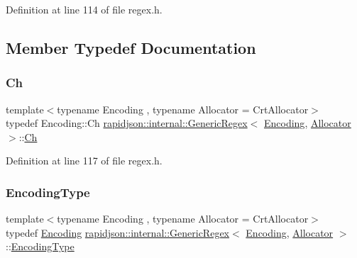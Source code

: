 Definition at line 114 of file regex.\+h.



\subsection{Member Typedef Documentation}
\mbox{\label{classrapidjson_1_1internal_1_1_generic_regex_a14c4770316f826aa03ee393ec218fe3d}} 
\subsubsection{\texorpdfstring{Ch}{Ch}}
{\footnotesize\ttfamily template$<$typename Encoding , typename Allocator  = Crt\+Allocator$>$ \\
typedef Encoding\+::\+Ch \mbox{\hyperlink{classrapidjson_1_1internal_1_1_generic_regex}{rapidjson\+::internal\+::\+Generic\+Regex}}$<$ \mbox{\hyperlink{classrapidjson_1_1_encoding}{Encoding}}, \mbox{\hyperlink{classrapidjson_1_1_allocator}{Allocator}} $>$\+::\mbox{\hyperlink{classrapidjson_1_1internal_1_1_generic_regex_a14c4770316f826aa03ee393ec218fe3d}{Ch}}}



Definition at line 117 of file regex.\+h.

\mbox{\label{classrapidjson_1_1internal_1_1_generic_regex_ac45239e5e5e2df52dcae5d117b1389c8}} 
\subsubsection{\texorpdfstring{EncodingType}{EncodingType}}
{\footnotesize\ttfamily template$<$typename Encoding , typename Allocator  = Crt\+Allocator$>$ \\
typedef \mbox{\hyperlink{classrapidjson_1_1_encoding}{Encoding}} \mbox{\hyperlink{classrapidjson_1_1internal_1_1_generic_regex}{rapidjson\+::internal\+::\+Generic\+Regex}}$<$ \mbox{\hyperlink{classrapidjson_1_1_encoding}{Encoding}}, \mbox{\hyperlink{classrapidjson_1_1_allocator}{Allocator}} $>$\+::\mbox{\hyperlink{classrapidjson_1_1internal_1_1_generic_regex_ac45239e5e5e2df52dcae5d117b1389c8}{Encoding\+Type}}}



